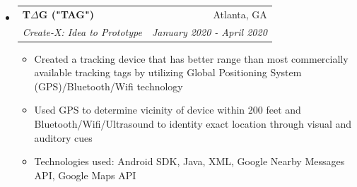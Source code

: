 \documentclass[letterpaper,11pt]{article}
\makeatletter
\newcommand{\resitem}[1]{\item #1 \vspace{-2pt}}
\newcommand{\ressubheading}[4]{
\begin{tabular*}{7.0in}{l@{\extracolsep{\fill}}r}
		\textbf{#1} & #2 \\
		\textit{#3} & \textit{#4} \\
\end{tabular*}\vspace{-6pt}}
\makeatother
\begin{document}
\begin{itemize}
\item
    \ressubheading{T$\Delta$G ("TAG")}{Atlanta, GA}{Create-X: Idea to Prototype}{January 2020 - April 2020}
    \begin{itemize}
        \resitem{Created a tracking device that has better range than most commercially available tracking tags by utilizing Global Positioning System (GPS)/Bluetooth/Wifi technology}
        \resitem{Used GPS to determine vicinity of device within 200 feet and Bluetooth/Wifi/Ultrasound to identity exact location through visual and auditory cues}
        \resitem{Technologies used: Android SDK, Java, XML, Google Nearby Messages API, Google Maps API}
    \end{itemize}

\end{itemize}
\end{document}
